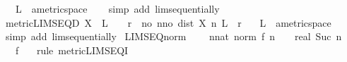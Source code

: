 \begin{isabellebody}
\ \ \ L\ {\isacharcolon}{\kern0pt}{\isacharcolon}{\kern0pt}\ {\isachardoublequoteopen}{\isacharprime}{\kern0pt}a{\isacharcolon}{\kern0pt}{\isacharcolon}{\kern0pt}metric{\isacharunderscore}{\kern0pt}space{\isachardoublequoteclose}\isanewline
%
\isadelimproof
\ \ %
\endisadelimproof
%
\isatagproof
{}\isamarkupfalse%
\ {\isacharparenleft}{\kern0pt}simp\ add{\isacharcolon}{\kern0pt}\ lim{\isacharunderscore}{\kern0pt}sequentially{\isacharparenright}{\kern0pt}%
\endisatagproof
{\isafoldproof}%
%
\isadelimproof
\isanewline
%
\endisadelimproof
\isanewline
{}\isamarkupfalse%
\ metric{\isacharunderscore}{\kern0pt}LIMSEQ{\isacharunderscore}{\kern0pt}D{\isacharcolon}{\kern0pt}\ {\isachardoublequoteopen}X\ {\isasymlonglonglongrightarrow}\ L\ {\isasymLongrightarrow}\ {}\ {\isacharless}{\kern0pt}\ r\ {\isasymLongrightarrow}\ {\isasymexists}no{\isachardot}{\kern0pt}\ {\isasymforall}n{\isasymge}no{\isachardot}{\kern0pt}\ dist\ {\isacharparenleft}{\kern0pt}X\ n{\isacharparenright}{\kern0pt}\ L\ {\isacharless}{\kern0pt}\ r{\isachardoublequoteclose}\isanewline
\ \ \ L\ {\isacharcolon}{\kern0pt}{\isacharcolon}{\kern0pt}\ {\isachardoublequoteopen}{\isacharprime}{\kern0pt}a{\isacharcolon}{\kern0pt}{\isacharcolon}{\kern0pt}metric{\isacharunderscore}{\kern0pt}space{\isachardoublequoteclose}\isanewline
%
\isadelimproof
\ \ %
\endisadelimproof
%
\isatagproof
{}\isamarkupfalse%
\ {\isacharparenleft}{\kern0pt}simp\ add{\isacharcolon}{\kern0pt}\ lim{\isacharunderscore}{\kern0pt}sequentially{\isacharparenright}{\kern0pt}%
\endisatagproof
{\isafoldproof}%
%
\isadelimproof
\isanewline
%
\endisadelimproof
\isanewline
{}\isamarkupfalse%
\ LIMSEQ{\isacharunderscore}{\kern0pt}norm{\isacharunderscore}{\kern0pt}{}{\isacharcolon}{\kern0pt}\isanewline
\ \ \ \ {\isachardoublequoteopen}{\isasymAnd}n{\isacharcolon}{\kern0pt}{\isacharcolon}{\kern0pt}nat{\isachardot}{\kern0pt}\ norm\ {\isacharparenleft}{\kern0pt}f\ n{\isacharparenright}{\kern0pt}\ {\isacharless}{\kern0pt}\ {}\ {\isacharslash}{\kern0pt}\ real\ {\isacharparenleft}{\kern0pt}Suc\ n{\isacharparenright}{\kern0pt}{\isachardoublequoteclose}\isanewline
\ \ \ {\isachardoublequoteopen}f\ {\isasymlonglonglongrightarrow}\ {}{\isachardoublequoteclose}\isanewline
%
\isadelimproof
%
\endisadelimproof
%
\isatagproof
{}\isamarkupfalse%
\ {\isacharparenleft}{\kern0pt}rule\ metric{\isacharunderscore}{\kern0pt}LIMSEQ{\isacharunderscore}{\kern0pt}I{\isacharparenright}{\kern0pt}\isanewline

\end{isabellebody}
